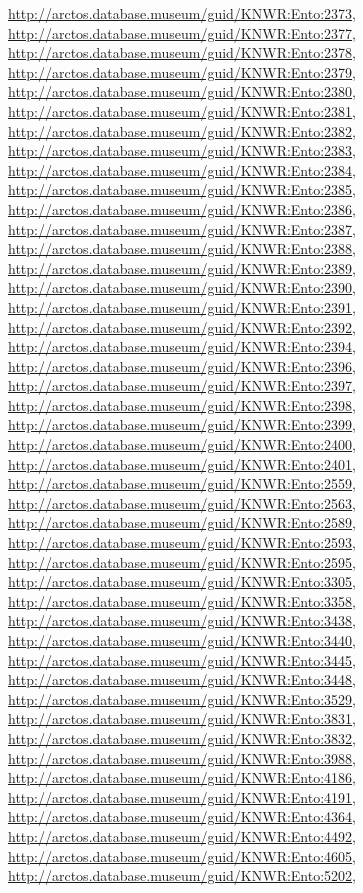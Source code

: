 \documentclass[9pt, article]{memoir}
\begin{document}
\begin{multicols}{2}
\url{http://arctos.database.museum/guid/KNWR:Ento:2373}, 
\url{http://arctos.database.museum/guid/KNWR:Ento:2377}, 
\url{http://arctos.database.museum/guid/KNWR:Ento:2378}, 
\url{http://arctos.database.museum/guid/KNWR:Ento:2379}, 
\url{http://arctos.database.museum/guid/KNWR:Ento:2380}, 
\url{http://arctos.database.museum/guid/KNWR:Ento:2381}, 
\url{http://arctos.database.museum/guid/KNWR:Ento:2382}, 
\url{http://arctos.database.museum/guid/KNWR:Ento:2383}, 
\url{http://arctos.database.museum/guid/KNWR:Ento:2384}, 
\url{http://arctos.database.museum/guid/KNWR:Ento:2385}, 
\url{http://arctos.database.museum/guid/KNWR:Ento:2386}, 
\url{http://arctos.database.museum/guid/KNWR:Ento:2387}, 
\url{http://arctos.database.museum/guid/KNWR:Ento:2388}, 
\url{http://arctos.database.museum/guid/KNWR:Ento:2389}, 
\url{http://arctos.database.museum/guid/KNWR:Ento:2390}, 
\url{http://arctos.database.museum/guid/KNWR:Ento:2391}, 
\url{http://arctos.database.museum/guid/KNWR:Ento:2392}, 
\url{http://arctos.database.museum/guid/KNWR:Ento:2394}, 
\url{http://arctos.database.museum/guid/KNWR:Ento:2396}, 
\url{http://arctos.database.museum/guid/KNWR:Ento:2397}, 
\url{http://arctos.database.museum/guid/KNWR:Ento:2398}, 
\url{http://arctos.database.museum/guid/KNWR:Ento:2399}, 
\url{http://arctos.database.museum/guid/KNWR:Ento:2400}, 
\url{http://arctos.database.museum/guid/KNWR:Ento:2401}, 
\url{http://arctos.database.museum/guid/KNWR:Ento:2559}, 
\url{http://arctos.database.museum/guid/KNWR:Ento:2563}, 
\url{http://arctos.database.museum/guid/KNWR:Ento:2589}, 
\url{http://arctos.database.museum/guid/KNWR:Ento:2593}, 
\url{http://arctos.database.museum/guid/KNWR:Ento:2595}, 
\url{http://arctos.database.museum/guid/KNWR:Ento:3305}, 
\url{http://arctos.database.museum/guid/KNWR:Ento:3358}, 
\url{http://arctos.database.museum/guid/KNWR:Ento:3438}, 
\url{http://arctos.database.museum/guid/KNWR:Ento:3440}, 
\url{http://arctos.database.museum/guid/KNWR:Ento:3445}, 
\url{http://arctos.database.museum/guid/KNWR:Ento:3448}, 
\url{http://arctos.database.museum/guid/KNWR:Ento:3529}, 
\url{http://arctos.database.museum/guid/KNWR:Ento:3831}, 
\url{http://arctos.database.museum/guid/KNWR:Ento:3832}, 
\url{http://arctos.database.museum/guid/KNWR:Ento:3988}, 
\url{http://arctos.database.museum/guid/KNWR:Ento:4186}, 
\url{http://arctos.database.museum/guid/KNWR:Ento:4191}, 
\url{http://arctos.database.museum/guid/KNWR:Ento:4364}, 
\url{http://arctos.database.museum/guid/KNWR:Ento:4492}, 
\url{http://arctos.database.museum/guid/KNWR:Ento:4605}, 
\url{http://arctos.database.museum/guid/KNWR:Ento:5202}, 

\end{multicols}
\end{document}
